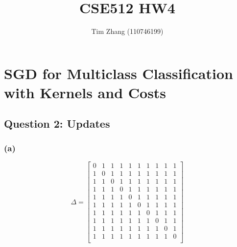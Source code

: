\documentclass[11pt, oneside]{article}   	%
\title{CSE512 HW4}
\author{Tim Zhang (110746199)}
\date{}							%
\begin{document}
\maketitle

\DeclarePairedDelimiter{\norm}{\lVert}{\rVert}

\section{SGD for Multiclass Classification with Kernels and Costs}
\subsection{Question 2: Updates}
\subsubsection{(a)}
 \[
   \Delta =
  \left[ {\begin{array}{cccccccccc}
   0 & 1 & 1 & 1 & 1 & 1 & 1 & 1 & 1  & 1\\
   1 & 0 & 1 & 1 & 1 & 1 & 1 & 1 & 1  & 1\\
   1 & 1 & 0 & 1 & 1 & 1 & 1 & 1 & 1 & 1\\
   1 & 1 & 1 & 0 & 1 & 1 & 1 & 1 & 1 & 1\\
   1 & 1 & 1 & 1 & 0 & 1 & 1 & 1 & 1 & 1\\
   1 & 1 & 1 & 1 & 1 & 0 & 1 & 1 & 1 & 1\\
   1 & 1 & 1 & 1 & 1 & 1 & 0 & 1 & 1 & 1\\
   1 & 1 & 1 & 1 & 1 & 1 & 1 & 0 & 1 & 1\\
   1 & 1 & 1 & 1 & 1 & 1 & 1 & 1 & 0 & 1\\
   1 & 1 & 1 & 1 & 1 & 1 & 1 & 1 & 1 & 0\\
  \end{array} } \right]
\]
\end{document}
